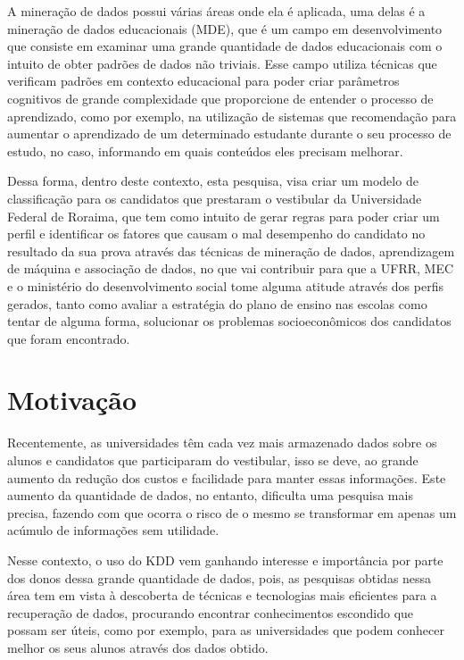 \par
A mineração de dados possui várias áreas onde ela é aplicada, uma delas é a mineração de dados educacionais (MDE), que é um campo em desenvolvimento que consiste em examinar uma grande quantidade de dados educacionais com o intuito de obter padrões de dados não triviais. Esse campo utiliza técnicas que verificam padrões em contexto educacional para poder criar parâmetros cognitivos de grande complexidade que proporcione de entender o processo de aprendizado, como por exemplo, na utilização de sistemas que recomendação para aumentar o aprendizado de um determinado estudante durante o seu processo de estudo, no caso, informando em quais conteúdos eles precisam melhorar.

\par
Dessa forma, dentro deste contexto, esta pesquisa, visa criar um modelo de classificação para os candidatos que prestaram o vestibular da Universidade Federal de Roraima,  que tem como intuito de gerar regras para poder criar um perfil e identificar os fatores que causam o mal desempenho do candidato no resultado da sua prova através das técnicas de mineração de dados, aprendizagem de máquina e associação de dados, no que vai contribuir para que a UFRR, MEC e o ministério do desenvolvimento social tome alguma atitude através dos perfis gerados, tanto como avaliar a estratégia do plano de ensino nas escolas como tentar de alguma forma, solucionar os problemas socioeconômicos dos candidatos que foram encontrado.







\section{Motivação}

Recentemente, as universidades têm cada vez mais armazenado dados sobre os alunos e candidatos que participaram do vestibular, isso se deve, ao  grande aumento da redução dos custos e facilidade para manter essas informações. Este aumento da quantidade de dados, no entanto, dificulta uma pesquisa mais precisa, fazendo com que ocorra o risco de o mesmo se transformar em apenas um acúmulo de informações sem utilidade. 

\par
Nesse contexto, o uso do KDD vem ganhando interesse e importância por parte dos donos dessa grande quantidade de dados, pois, as pesquisas obtidas nessa área tem em vista à descoberta de técnicas e tecnologias mais eficientes para a recuperação de dados, procurando encontrar conhecimentos escondido que possam ser úteis, como por exemplo, para as universidades que podem conhecer melhor os seus alunos através dos dados obtido.

